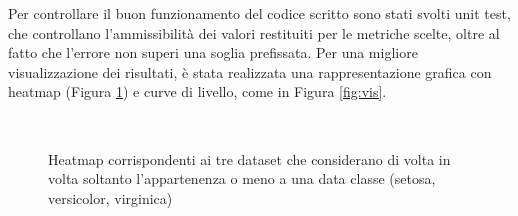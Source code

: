 \documentclass[oneside, openany]{book}
\begin{document}
	Per controllare il buon funzionamento del codice scritto sono stati svolti unit test, che controllano l'ammissibilità dei valori restituiti per le metriche scelte, oltre al fatto che l'errore non superi una soglia prefissata. 
	Per una migliore visualizzazione dei risultati, è stata realizzata una rappresentazione grafica con heatmap (Figura \ref{fig:hm}) e curve di livello, come in Figura \ref{fig:vis}. 
	\begin{figure}[h!]
		\quad 
		\quad
		\\
		\caption{Heatmap corrispondenti ai tre dataset che considerano di volta in volta soltanto l'appartenenza o meno a una data classe (setosa, versicolor, virginica)}
		\label{fig:hm}
	\end{figure}
\end{document}
